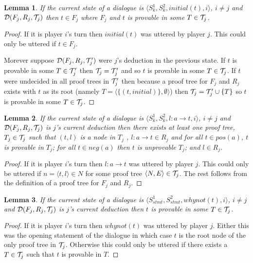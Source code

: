 \documentclass{blue-book}
\newtheorem{lemma}{Lemma}
\newcommand{\drule}[3]{\ensuremath{#1:#2 \rightarrow #3}}
\newcommand{\pt}[2]{\ensuremath{\langle #1,#2 \rangle}}
\newcommand{\intree}[2]{\ensuremath{#1 \in_t #2}}
\newcommand{\node}[2]{\ensuremath{(#1, #2)}}
\newcommand{\deduction}[3]{\ensuremath{{\cal D}(#1, #2, #3)}}
\begin{document}
\begin{lemma}
\label{lem:initial}
If the current state of a dialogue is $\langle S^1_{k}, S^2_{k}, initial(t), i \rangle$,  $i \neq j$ and $\deduction{F_j}{R_j}{{\cal T}_j}$ then  $t \in F_j$ where $F_j$ and $t$ is provable in some $T \in {\cal T}_j$.%
\end{lemma}
\begin{proof}
If it is player $i$'s turn then $initial(t)$ was uttered by player $j$.  This could only be uttered if $t \in F_j$.  

Morever suppose $\deduction{F_j}{R_j}{{\cal T}_j'}$ were $j$'s deduction in the previous state. If $t$ is provable in some $T \in {\cal T}_j'$ then ${\cal T}_j = {\cal T}_j'$ and so $t$ is provable in some $T \in {\cal T}_j$.  If $t$ were undecided in all proof trees in ${\cal T}_j'$ then because a proof tree for $F_j$ and $R_j$ exists with $t$ as its root (namely $T = \pt{\{\node{t}{initial}\}}{\emptyset}$) then ${\cal T}_j = {\cal T}_j' \cup \{T\}$ so  $t$ is provable in some $T \in {\cal T}_j$.%
\end{proof}
\begin{lemma}
\label{lem:drule}
If the current state of a dialogue is $\langle S^1_{k}, S^2_{k}, \drule{l}{a}{t}, i \rangle$, $i \neq j$ and $\deduction{F_j}{R_j}{{\cal T}_j}$ is $j$'s current deduction then there exists at least one proof tree, $T_j \in {\cal T}_j$  such that $\node{t}{l}$ is a node in $T_j$ , $\drule{l}{a}{t} \in R_j$ and for all $t\in pos(a)$, $t$ is provable in $T_j$; for all $t \in neg(a)$  then $t$ is unprovable $T_j$; and $l \in R_j$.
\end{lemma}
\begin{proof}
If it is player $i$'s turn then $\drule{l}{a}{t}$ was uttered by player $j$.  This could only be uttered if $n = \langle t, l \rangle \in N$ for some proof tree $\pt{N}{E} \in {\cal T}_j$.  The rest follows from the definition of a proof tree for $F_j$ and $R_j$.
\end{proof}
\begin{lemma}
\label{lem:whynot}
If the current state of a dialogue is $\langle S^1_{stmt}, S^2_{stmt}, whynot(t), i \rangle$, $i \neq j$ and $\deduction{F_j}{R_j}{{\cal T}_j}$ is $j$'s current deduction then $t$ is provable in some $T \in {\cal T}_j$.
\end{lemma}
\begin{proof}
If it is player $i$'s turn then $whynot(t)$ was uttered by player $j$.  Either this was the opening statement of the dialogue in which case $t$ is the root node of the only proof tree in ${\cal T}_j$.  Otherwise this could only be uttered if there exists a $T \in {\cal T}_j$ such that $t$ is provable in $T$.
\end{proof}
\end{document}
